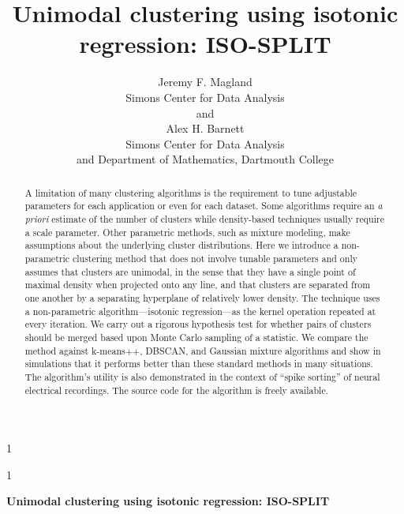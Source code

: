 \documentclass[10pt]{article}
\newcommand{\blind}{1}
\begin{document}
%

\def\spacingset#1{\renewcommand{\baselinestretch}%
{#1}\small\normalsize} \spacingset{1}


\blind
{
  \title{\bf Unimodal clustering using isotonic regression: ISO-SPLIT}
  \author{Jeremy F. Magland\hspace{.2cm}\\
    Simons Center for Data Analysis\\
    and \\
    Alex H. Barnett \\
    Simons Center for Data Analysis \\ and Department of Mathematics, Dartmouth College}
  \maketitle
} \fi

\blind
{
  \bigskip
  \bigskip
  \bigskip
  \begin{center}
    {\LARGE\bf Unimodal clustering using isotonic regression: ISO-SPLIT}
  \end{center}
  \medskip
} \fi

\bigskip
\begin{abstract}
A limitation of many clustering algorithms is the requirement to tune adjustable parameters for each application or even for each dataset. Some algorithms require an \emph{a priori} estimate of the number of clusters while density-based techniques usually require a scale parameter. Other parametric methods, such as mixture modeling, make assumptions about the underlying cluster distributions. Here we introduce a non-parametric clustering method that does not involve tunable parameters and only assumes that clusters are unimodal, in the sense that they have a single point of maximal density when projected onto any line, and that clusters are separated from one another by a separating hyperplane of relatively lower density. The technique uses a non-parametric algorithm---isotonic regression---as the kernel operation repeated at every iteration. We carry out a rigorous hypothesis test for whether pairs of clusters should be merged based upon Monte Carlo sampling of a statistic. We compare the method against k-means++, DBSCAN, and Gaussian mixture algorithms and show in simulations that it performs better than these standard methods in many situations. The algorithm's utility is also demonstrated in the context of ``spike sorting'' of neural electrical recordings. The source code for the algorithm is freely available.
\end{abstract}
\end{document}
